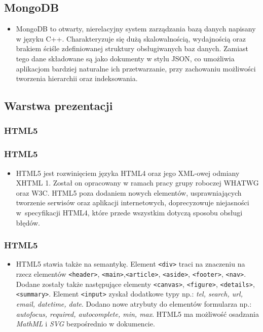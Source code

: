 \documentclass{beamer}
\newenvironment{justbe}%
{\setlength{\leftmargini}{0pt}\begin{itemize}\item[]}%
{\end{itemize}}
\begin{document}
	\subsection{MongoDB}
\begin{frame}
	\begin{justbe}
	MongoDB to otwarty, nierelacyjny system zarządzania bazą danych napisany w języku C++. Charakteryzuje się dużą skalowalnością, wydajnością oraz brakiem ściśle zdefiniowanej struktury obsługiwanych baz danych. Zamiast tego dane składowane są jako dokumenty w stylu JSON, co umożliwia aplikacjom bardziej naturalne ich przetwarzanie, przy zachowaniu możliwości tworzenia hierarchii oraz indeksowania.
	\end{justbe}
\end{frame}
\subsection{Warstwa prezentacji}
\subsubsection{HTML5}

\begin{frame}
 \frametitle{HTML5}
 \begin{justbe}
  HTML5 jest rozwinięciem języka HTML4 oraz jego XML-owej odmiany XHTML 1. Został on opracowany w ramach pracy grupy roboczej WHATWG oraz W3C. HTML5 poza dodaniem nowych elementów, usprawniających tworzenie serwisów oraz aplikacji internetowych, doprecyzowuje niejasności w~specyfikacji HTML4, które przede wszystkim dotyczą sposobu obsługi błędów.
 \end{justbe}
\end{frame}

\begin{frame}[fragile]
 \frametitle{HTML5}
 \begin{justbe}
  HTML5 stawia także na semantykę. Element \verb|<div>| traci na znaczeniu na rzecz elementów \verb|<header>|, \verb|<main>|,\verb|<article>|, \verb|<aside>|, \verb|<footer>|, \verb|<nav>|. Dodane zostały także następujące elementy \verb|<canvas>|, \verb|<figure>|, \verb|<details>|, \verb|<summary>|. Element \verb|<input>| zyskał dodatkowe typy np.: \textit{tel, search, url, email, datetime, date}. Dodano nowe atrybuty do elementów formularza np.: \textit{autofocus, required, autocomplete, min, max}. HTML5 ma możliwość osadzania \emph{MathML} i \emph{SVG} bezpośrednio w dokumencie.
 \end{justbe}
\end{frame}
\end{document}
